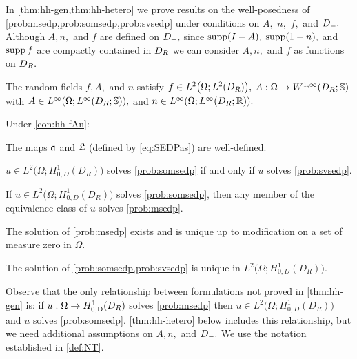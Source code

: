 In \cref{thm:hh-gen,thm:hh-hetero} we prove results on the well-posedness of \cref{prob:msedp,prob:somsedp,prob:svsedp} under conditions on $A,$ $n,$ $f,$ and $D_{-}.$ Although $A,n,$ and $f$ are defined on $D_{+},$ since $\operatorname{supp}(I-A),$ $\operatorname{supp}(1-n),$ and $\operatorname{supp} f$ are compactly contained in  $D_{R}$ we can consider $A,n,$ and $f$ as functions on $D_{R}.$

\label{con:hh-fAn}
The random fields $f, A,$ and $n$ satisfy $f \in \LtOLtDR,$  $A:\Omega \rightarrow \WoiDRRRdtd$ with $A \in \LiOLiDRRRdtd,$ and $n \in \LiOLiDRRR.$
\econ

\label{thm:hh-gen}
Under \cref{con:hh-fAn}:
\bit
\item The maps $\mathfrak{a}$ and $\mathfrak{L}$ (defined by \eqref{eq:SEDPas}) are well-defined.
\item $u \in %
L^2\big(\Omega;H_{0,D}^1(D_R)\big)$
solves \cref{prob:somsedp} if and only if $u$ solves \cref{prob:svsedp}.
\item If $u \in
L^2\big(\Omega;H_{0,D}^1(D_R)\big)$
solves \cref{prob:somsedp}, then any member of the equivalence class of $u$ solves \cref{prob:msedp}.
\item The solution of \cref{prob:msedp} exists and is unique up to modification on a set of measure zero in $\Omega.$
\item The solution of \cref{prob:somsedp,prob:svsedp} is unique in $L^2\big(\Omega;H_{0,D}^1(D_R)\big)$. %
\eit
\enth

Observe that the only relationship between formulations not proved in \cref{thm:hh-gen} is: if $u:\Omega\rightarrow \HozDDR$  solves \cref{prob:msedp} then $u \in 
L^2\big(\Omega;H_{0,D}^1(D_R)\big)$
and $u$ solves \cref{prob:somsedp}. \cref{thm:hh-hetero} below includes this relationship, but we need additional assumptions on $A,n,$ and $D_{-}.$ We use the notation established in \cref{def:NT}.


